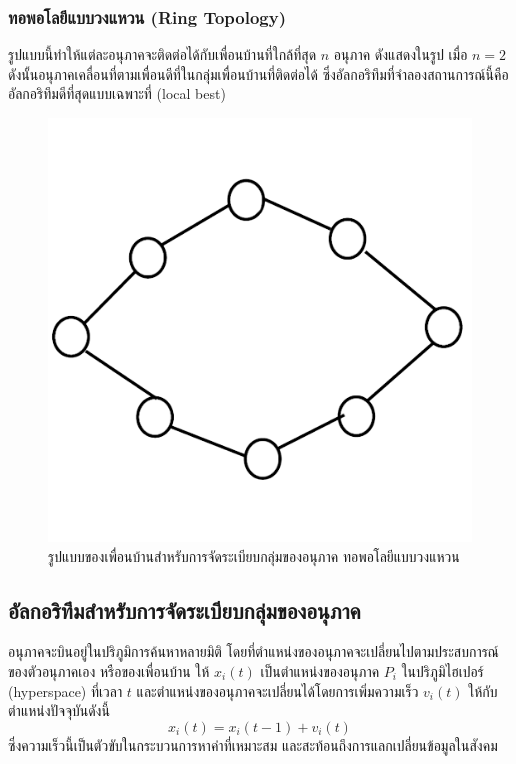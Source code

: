 \subsubsection{ทอพอโลยีแบบวงแหวน (Ring Topology)}
รูปแบบนี้ทำให้แต่ละอนุภาคจะติดต่อได้กับเพื่อนบ้านที่ใกล้ที่สุด \(n\) อนุภาค ดังแสดงในรูป เมื่อ \(n=2\) ดังนั้นอนุภาคเคลื่อนที่ตามเพื่อนดีที่ในกลุ่มเพื่อนบ้านที่ติดต่อได้ ซึ่งอัลกอริทึมที่จำลองสถานการณ์นี้คือ อัลกอริทึมดีที่สุดแบบเฉพาะที่ (local best)
\begin{figure}[ht]
    \centering
    \includegraphics[scale=0.3]{images/ring_topology.png}
    \caption{รูปแบบของเพื่อนบ้านสำหรับการจัดระเบียบกลุ่มของอนุภาค ทอพอโลยีแบบวงแหวน}
    \label{fig:6}
\end{figure}

\subsection{อัลกอริทึมสำหรับการจัดระเบียบกลุ่มของอนุภาค}
อนุภาคจะบินอยู่ในปริภูมิการค้นหาหลายมิติ โดยที่ตำแหน่งของอนุภาคจะเปลี่ยนไปตามประสบการณ์ของตัวอนุภาคเอง หรือของเพื่อนบ้าน ให้ \(x_{i}(t)\) เป็นตำแหน่งของอนุภาค \(P_{i}\) ในปริภูมิไฮเปอร์ (hyperspace) ที่เวลา \(t\) และตำแหน่งของอนุภาคจะเปลี่ยนได้โดยการเพิ่มความเร็ว \(v_{i}(t)\) ให้กับตำแหน่งปัจจุบันดังนี้
\begin{equation}
  x_{i}(t) = x_{i}(t-1)+v_{i}(t)
\end{equation}
ซึ่งความเร็วนี้เป็นตัวขับในกระบวนการหาค่าที่เหมาะสม และสะท้อนถึงการแลกเปลี่ยนข้อมูลในสังคม

